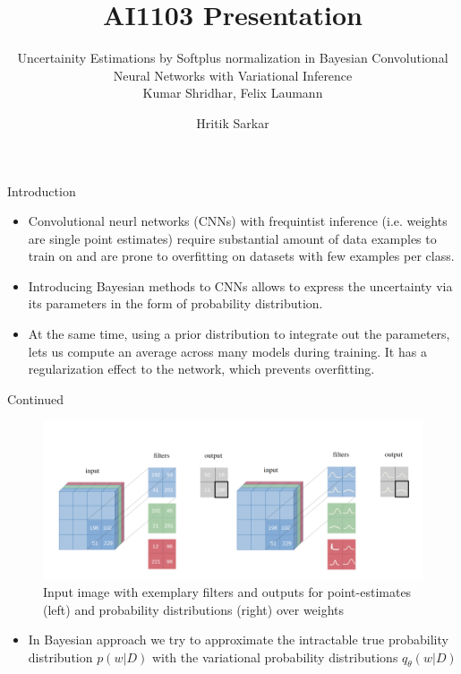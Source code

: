 \documentclass{beamer}
\title{AI1103 Presentation}
\subtitle{Uncertainity Estimations by Softplus normalization in Bayesian Convolutional Neural Networks with Variational Inference \\ Kumar Shridhar, Felix Laumann}
\author{Hritik Sarkar}
\theoremstyle{remark}
\begin{document}
\begin{frame}
\titlepage
\end{frame}
\begin{frame}{Introduction}
    \begin{itemize}
        \item Convolutional neurl networks (CNNs) with frequintist inference (i.e. weights are single point estimates) require substantial amount of data examples to train on and are prone to overfitting on datasets with few examples per class.
        \item Introducing Bayesian methods to CNNs allows to express the uncertainty via its parameters in the form of probability distribution.
        \item At the same time, using a prior distribution to integrate out the parameters, lets us compute an average across many models during training. It has a regularization effect to the network, which prevents overfitting.
    \end{itemize}
\end{frame}
\begin{frame}{Continued}
    \begin{figure}
        \centering
        \includegraphics[scale=0.2]{project_img1.png}
        \caption{Input image with exemplary filters and outputs for point-estimates (left) and probability distributions (right) over weights}
        \label{fig1}
    \end{figure}
    \begin{itemize}
        \item In Bayesian approach we try to approximate the intractable true probability distribution $p(w|D)$ with the variational probability distributions $q_\theta(w|D)$
    \end{itemize}
\end{frame}
\end{document}
